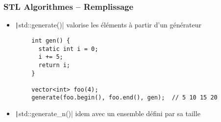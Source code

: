 \documentclass[C++.tex]{subfiles}
\begin{document}
\begin{frame}[fragile]
	\frametitle{STL Algorithmes -- Remplissage}
	\begin{itemize}
		\item \texttt|std::generate()| valorise les éléments à partir d'un générateur
	\end{itemize}

	\begin{verbatim}
		int gen() {
		  static int i = 0;
		  i += 5;
		  return i;
		}

		vector<int> foo(4);
		generate(foo.begin(), foo.end(), gen);  // 5 10 15 20
	\end{verbatim}

	\begin{itemize}
		\item \texttt|std::generate_n()| idem avec un ensemble défini par sa taille
	\end{itemize}

\end{frame}
\end{document}
